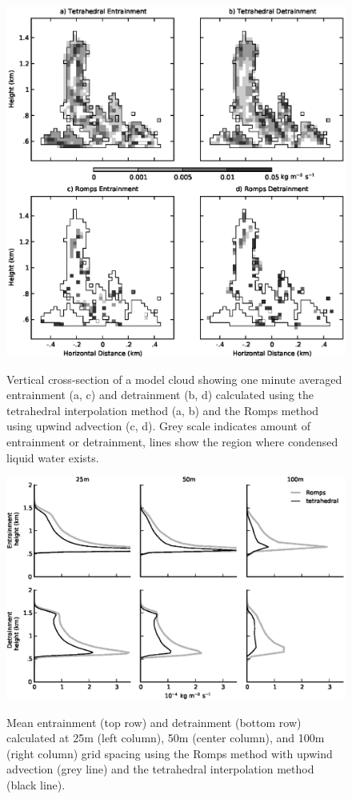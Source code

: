 \documentclass[12pt]{article}
\begin{document}
\begin{figure}[t]
  \noindent\includegraphics[width=39pc,angle=0]{./figures/spatial_variability_1min}\\ 
  \caption{Vertical cross-section of a model cloud showing one minute averaged 
  entrainment (a, c) and detrainment (b, d) calculated using the tetrahedral 
  interpolation method (a, b) and the Romps method using upwind advection (c, 
  d).  Grey scale indicates amount of entrainment or detrainment, lines show the 
  region where condensed liquid water exists.
  }
  \label{fig:spatial_variability}
\end{figure}

\begin{figure}[t]
  \noindent
  \includegraphics[width=39pc,angle=0]{./figures/resolution_dependence}\\
  \caption{Mean entrainment (top row) and detrainment (bottom row) calculated
  at 25m (left column), 50m (center column), and 100m (right column) grid 
  spacing using the Romps method with upwind advection (grey line) and the 
  tetrahedral interpolation method (black line).
  }
  \label{fig:resolution_dependence}
\end{figure}
\end{document}
